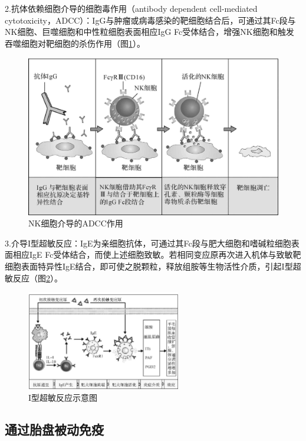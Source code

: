 2.抗体依赖细胞介导的细胞毒作用（antibody dependent cell-mediated
cytotoxicity，ADCC）：IgG与肿瘤或病毒感染的靶细胞结合后，可通过其Fc段与NK细胞、巨噬细胞和中性粒细胞表面相应IgG
Fc受体结合，增强NK细胞和触发吞噬细胞对靶细胞的杀伤作用（图\ref{fig4-8}）。

\begin{figure}[!htbp]
 \centering
 \includegraphics{./images/Image00068.jpg}
 \captionsetup{justification=centering}
 \caption{NK细胞介导的ADCC作用}
 \label{fig4-8}
  \end{figure} 

3.介导I型超敏反应：IgE为亲细胞抗体，可通过其Fc段与肥大细胞和嗜碱粒细胞表面相应IgE
Fc受体结合，而使上述细胞致敏。若相同变应原再次进入机体与致敏靶细胞表面特异性IgE结合，即可使之脱颗粒，释放组胺等生物活性介质，引起I型超敏反应（图\ref{fig4-9}）。

\begin{figure}[!htbp]
 \centering
 \includegraphics[width=0.6\textwidth]{./images/Image00069.jpg}
 \captionsetup{justification=centering}
 \caption{I型超敏反应示意图}
 \label{fig4-9}
  \end{figure} 


\subsection{通过胎盘被动免疫}

